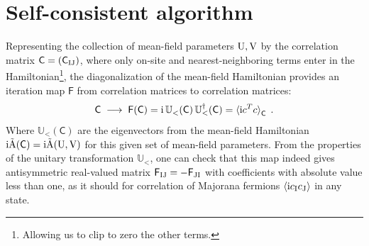 

\section{Self-consistent algorithm}\label{sec:4-algorithm}

Representing the collection of mean-field parameters $\mathrm{U}, \mathrm{V}$ by the correlation matrix ${\mathsf{C}}=({\mathsf{C}}_{{\mathrm{I}}{\mathrm{J}}})$, where only on-site and nearest-neighboring terms enter in the Hamiltonian\footnote{Allowing us to clip to zero the other terms.}, the diagonalization of the mean-field Hamiltonian provides an iteration map ${\mathsf{F}}$ from correlation matrices to correlation matrices:
\begin{equation}
    {\mathsf{C}} \; \longrightarrow \; {\mathsf{F}}({\mathsf{C}}) = \im\,\mathbb{U}_{<}^{\pd}({\mathsf{C}}) \, \mathbb{U}_{<}^\dagger({\mathsf{C}})  = \braket{\im c^T c}_{{\mathsf{C}}} \; .
\end{equation}
Where $\mathbb{U}_{<}({\mathsf{C}})$ are the eigenvectors from the mean-field Hamiltonian $\mathrm{i} \tilde{\mathrm{A}}({\mathsf{C}})=\mathrm{i} \tilde{\mathrm{A}}(\mathrm{U},\mathrm{V})$ for this given set of mean-field parameters. From the properties of the unitary transformation $\mathbb{U}_{<}$, one can check that this map indeed gives antisymmetric real-valued matrix ${\mathsf{F}}_{{\mathrm{I}}{\mathrm{J}}}=-{\mathsf{F}}_{{\mathrm{J}}{\mathrm{I}}}$  with coefficients with absolute value less than one, as it should for correlation of Majorana fermions $\braket{\mathrm{i} c_{\mathrm{I}} c_{\mathrm{J}}}$ in any state.

